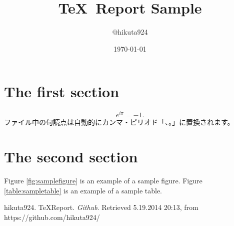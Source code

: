
\title{\TeX\ Report Sample}
\author{@hikuta924}
\date{\today}

\maketitle

\section{The first section}
\begin{equation}
	e^{i \pi} = -1.
\end{equation}
ファイル中の句読点は自動的にカンマ・ピリオド「、。」に置換されます。

\section{The second section}
Figure \ref{fig:samplefigure} is an example of a sample figure.
Figure \ref{table:sampletable} is an example of a sample table.


\begin{thebibliography}{AAA999}
     hikuta924. TeXReport. {\em Github}. Retrieved 5.19.2014 20:13, from https://github.com/hikuta924/
\end{thebibliography}

